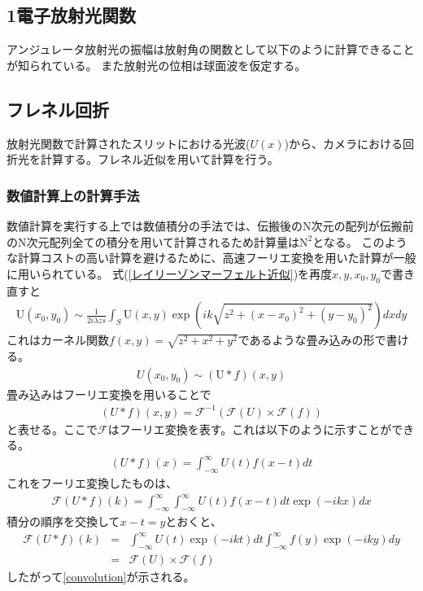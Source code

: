 \documentclass[a4paper,11pt,uplatex]{jsbook}
\begin{document}
\subsection{1電子放射光関数}
アンジュレータ放射光の振幅は放射角の関数として以下のように計算できることが知られている。
また放射光の位相は球面波を仮定する。

\subsection{フレネル回折}
放射光関数で計算されたスリットにおける光波($U(x)$)から、カメラにおける回折光を計算する。フレネル近似を用いて計算を行う。

\subsubsection{数値計算上の計算手法}
数値計算を実行する上では数値積分の手法では、伝搬後のN次元の配列が伝搬前のN次元配列全ての積分を用いて計算されるため計算量は$\text{N}^2$となる。
このような計算コストの高い計算を避けるために、高速フーリエ変換を用いた計算が一般に用いられている。
式(\ref{レイリーゾンマーフェルト近似})を再度$x,y,x_0,y_0$で書き直すと
\begin{eqnarray}
  \text{U}(x_0,y_0) \sim \frac{1}{2i\lambda zs}\int_S \text{U}(x,y) \exp( ik \sqrt{z^2 + (x-x_0)^2 + (y-y_0)^2}) dxdy
\end{eqnarray}
これはカーネル関数$f(x,y) = \sqrt{z^2 +x^2 + y^2}$であるような畳み込みの形で書ける。
\begin{eqnarray}
  U(x_0,y_0) \sim (\text{U} * f)(x,y)
\end{eqnarray}
畳み込みはフーリエ変換を用いることで
\begin{eqnarray}
  (U*f)(x,y) = \mathcal{F}^{-1}(\mathcal{F}(U) \times \mathcal{F}(f)) \label{convolution}
\end{eqnarray}
と表せる。ここで$\mathcal{F}$はフーリエ変換を表す。これは以下のように示すことができる。
\begin{eqnarray}
  (U*f)(x) = \int_{-\infty}^{\infty} U(t)f(x-t)dt
\end{eqnarray}
これをフーリエ変換したものは、
\begin{eqnarray}
  \mathcal{F}(U*f)(k) = \int_{-\infty}^{\infty} \int_{-\infty}^{\infty} U(t)f(x-t)dt \exp(-ikx)dx
\end{eqnarray}
積分の順序を交換して$x-t = y$とおくと、
\begin{eqnarray}
  \mathcal{F}(U*f)(k) &=& \int_{-\infty}^{\infty} U(t) \exp(-ikt)dt \int_{-\infty}^{\infty} f(y) \exp(-iky)dy\\
  &=& \mathcal{F}(U) \times \mathcal{F}(f)
\end{eqnarray}
したがって\ref{convolution}が示される。
\end{document}
